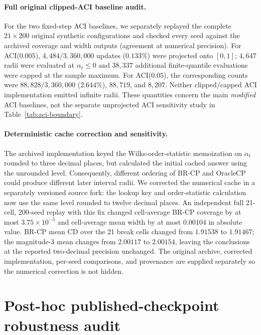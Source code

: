 \documentclass[10pt]{article}
\begin{document}
\paragraph{Full original clipped-ACI baseline audit.}
For the two fixed-step ACI baselines, we separately replayed the complete
$21\times200$ original synthetic configurations and checked every seed against
the archived coverage and width outputs (agreement at numerical precision).
For ACI($0.005$), $4{,}484/3{,}360{,}000$ updates ($0.133\%$) were projected
onto $[0,1]$; $4{,}647$ radii were evaluated at $\alpha_t\le0$ and $38{,}337$
additional finite-quantile evaluations were capped at the sample maximum.
For ACI($0.05$), the corresponding counts were $88{,}828/3{,}360{,}000$
($2.644\%$), $88{,}719$, and $8{,}207$. Neither clipped/capped ACI
implementation emitted infinite radii. These quantities concern the main
\emph{modified} ACI baselines, not the separate unprojected ACI sensitivity
study in Table~\ref{tab:aci-boundary}.

\paragraph{Deterministic cache correction and sensitivity.}
The archived implementation keyed the Wilks-order-statistic memoization on
$\alpha_t$ rounded to three decimal places, but calculated the initial cached
answer using the unrounded level. Consequently, different ordering of
BR-CP and OracleCP could produce different later interval radii. We corrected
the numerical cache in a separately versioned source fork: the lookup key
and order-statistic calculation now use the same level rounded to twelve
decimal places. An independent full 21-cell, 200-seed replay with this fix
changed cell-average BR-CP coverage by at most $3.75\times10^{-5}$ and
cell-average mean width by at most $0.00104$ in absolute value. BR-CP mean
CD over the 21 break cells changed from $1.91538$ to $1.91467$; the
magnitude-3 mean changes from $2.00117$ to $2.00154$, leaving the
conclusions at the reported two-decimal precision unchanged. The original
archive, corrected implementation, per-seed comparisons, and provenance
are supplied separately so the numerical correction is not hidden.


\section{Post-hoc published-checkpoint robustness audit}
\label{sec:chronos_posthoc}
\end{document}
